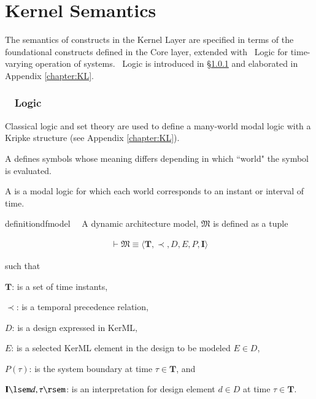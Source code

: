 
\chapter{Kernel Semantics}\label{chap:kernelsemantics}


\pn The semantics of constructs in the Kernel Layer are specified in terms of the foundational constructs defined in the Core layer, extended with \lang~Logic for time-varying operation of systems.  \lang~Logic is introduced in \S\ref{sec:modallogic} and elaborated in Appendix \ref{chapter:KL}.




\subsection{\logicid~ Logic}\label{sec:modallogic}


\pn Classical logic and set theory are used to define a many-world modal logic with a Kripke structure (see Appendix \ref{chapter:KL}).

\pn A  defines symbols whose meaning differs depending in which ``world" the symbol is evaluated.

\pn A  is a modal logic for which each world corresponds to an instant or interval of time.

\begin{restatable}{definition}{dfmodel}~~ 
A dynamic architecture model, $\mathfrak{M}$ is defined as a tuple
 
\begin{align}
\vdash \mathfrak{M}
  \equiv \langle \mathbf{T}, \prec, D, E, P, \mathbf{I} \rangle \label{eq:df-model}\tag{df-model}
\end{align}
 
  such that
 
$\mathbf{T}$: is a set of time instants, 

$\prec$: is a temporal precedence relation, 

$D$: is a design expressed in KerML,

$E$: is a selected KerML element in the design to be modeled $E \in D$, 

$P(\tau)$: is the system boundary at time $\tau \in \mathbf{T}$, and

$\mathbf{I}\lsem d,\tau\rsem$: is an interpretation for design element $d\in D$ at time $\tau \in \mathbf{T}$.
\end{restatable}

